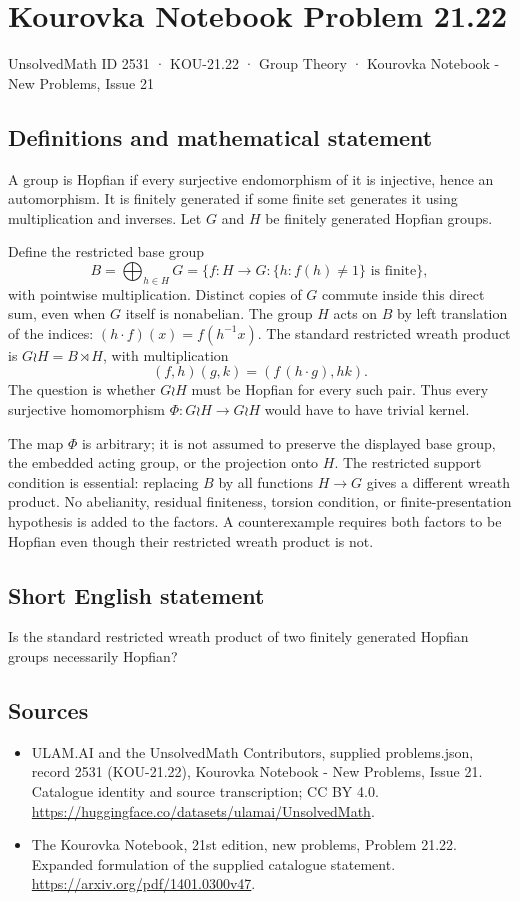 \documentclass[11pt,a4paper]{article}
\begin{document}
\section*{Kourovka Notebook Problem 21.22}\label{2531}
{\small UnsolvedMath ID 2531 · KOU-21.22 · Group Theory · Kourovka Notebook - New Problems, Issue 21}
\subsection{Definitions and mathematical statement}
A group is Hopfian if every surjective endomorphism of it is injective,
hence an automorphism. It is finitely generated if some finite set generates
it using multiplication and inverses.
Let $G$ and $H$ be finitely generated Hopfian groups.

Define the restricted base group
\[
 B=\bigoplus_{h\in H}G
   =\{f:H\to G:\{h:f(h)\ne1\}\text{ is finite}\},
\]
with pointwise multiplication. Distinct copies of $G$ commute inside
this direct sum, even when $G$ itself is nonabelian. The group $H$ acts
on $B$ by left translation of the indices:
$(h\cdot f)(x)=f(h^{-1}x)$. The standard restricted wreath product is
$G\wr H=B\rtimes H$, with multiplication
\[
 (f,h)(g,k)=(f\,(h\cdot g),hk).
\]
The question is whether $G\wr H$ must be Hopfian for every such pair.
Thus every surjective homomorphism $\Phi:G\wr H\to G\wr H$ would have
to have trivial kernel.

The map $\Phi$ is arbitrary; it is not assumed to preserve the displayed
base group, the embedded acting group, or the projection onto $H$.
The restricted support condition is essential: replacing $B$ by all
functions $H\to G$ gives a different wreath product. No abelianity,
residual finiteness, torsion condition, or finite-presentation hypothesis
is added to the factors. A counterexample requires both factors to be
Hopfian even though their restricted wreath product is not.
\subsection{Short English statement}
Is the standard restricted wreath product of two finitely generated Hopfian groups necessarily Hopfian?
\subsection{Sources}
\begin{itemize}
\item[S1] ULAM.AI and the UnsolvedMath Contributors, supplied problems.json, record 2531 (KOU-21.22), Kourovka Notebook - New Problems, Issue 21. Catalogue identity and source transcription; CC BY 4.0.
\url{https://huggingface.co/datasets/ulamai/UnsolvedMath}.
\item[S2] The Kourovka Notebook, 21st edition, new problems, Problem 21.22. Expanded formulation of the supplied catalogue statement.
\url{https://arxiv.org/pdf/1401.0300v47}.
\end{itemize}
\end{document}
